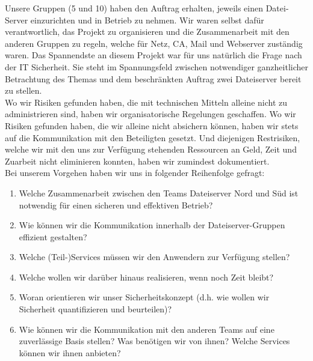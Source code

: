 Unsere Gruppen (5 und 10) haben den Auftrag erhalten, jeweils einen Datei-Server einzurichten und in Betrieb zu nehmen. Wir waren selbst dafür verantwortlich, das Projekt zu organisieren und die Zusammenarbeit mit den anderen Gruppen zu regeln, welche für Netz, CA, Mail und Webserver zuständig waren. Das Spannendste an diesem Projekt war für uns natürlich die Frage nach der IT Sicherheit. Sie steht im Spannungsfeld zwischen notwendiger ganzheitlicher Betrachtung des Themas und dem beschränkten Auftrag zwei Dateiserver bereit zu stellen.\\

Wo wir Risiken gefunden haben, die mit technischen Mitteln alleine nicht zu administrieren sind, haben wir organisatorische Regelungen geschaffen. Wo wir Risiken gefunden haben, die wir alleine nicht absichern können, haben wir stets auf die Kommunikation mit den Beteiligten gesetzt. Und diejenigen Restrisiken, welche wir mit den uns zur Verfügung stehenden Ressourcen an Geld, Zeit und Zuarbeit nicht eliminieren konnten, haben wir zumindest dokumentiert.\\

Bei unserem Vorgehen haben wir uns in folgender Reihenfolge gefragt:

\begin{enumerate}
\item Welche Zusammenarbeit zwischen den Teams Dateiserver Nord und Süd ist \newline notwendig für einen sicheren und effektiven Betrieb?
\item Wie können wir die Kommunikation innerhalb der Dateiserver-Gruppen effizient \newline gestalten?
\item Welche (Teil-)Services müssen wir den Anwendern zur Verfügung stellen?
\item Welche wollen wir darüber hinaus realisieren, wenn noch Zeit bleibt?
\item Woran orientieren wir unser Sicherheitskonzept
(d.h. wie wollen wir Sicherheit \newline quantifizieren und beurteilen)?
\item Wie können wir die Kommunikation mit den anderen Teams auf eine zuverlässige Basis stellen? Was benötigen wir von ihnen? Welche Services können wir ihnen anbieten?
\end{enumerate}


